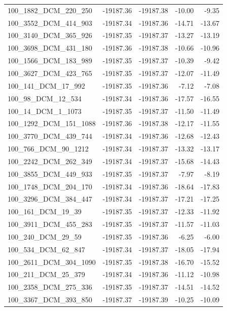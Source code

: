 \documentclass[journal=jacsat,manuscript=article]{achemso}
\begin{document}
\begin{table}[b!]
\begin{tabular}{lrrrr}
100\_1882\_DCM\_220\_250  & -19187.36 & -19187.38 &  -10.00 &  -9.35 \\
100\_3552\_DCM\_414\_903  & -19187.34 & -19187.36 &  -14.71 & -13.67 \\
100\_3140\_DCM\_365\_926  & -19187.35 & -19187.37 &  -13.27 & -13.19 \\
100\_3698\_DCM\_431\_180  & -19187.36 & -19187.38 &  -10.66 & -10.96 \\
100\_1566\_DCM\_183\_989  & -19187.35 & -19187.37 &  -10.39 &  -9.42 \\
100\_3627\_DCM\_423\_765  & -19187.35 & -19187.37 &  -12.07 & -11.49 \\
100\_141\_DCM\_17\_992    & -19187.35 & -19187.36 &   -7.12 &  -7.08 \\
100\_98\_DCM\_12\_534     & -19187.34 & -19187.36 &  -17.57 & -16.55 \\
100\_14\_DCM\_1\_1073     & -19187.35 & -19187.37 &  -11.50 & -11.49 \\
100\_1292\_DCM\_151\_1088 & -19187.36 & -19187.38 &  -12.17 & -11.55 \\
100\_3770\_DCM\_439\_744  & -19187.34 & -19187.36 &  -12.68 & -12.43 \\
100\_766\_DCM\_90\_1212   & -19187.34 & -19187.37 &  -13.32 & -13.17 \\
100\_2242\_DCM\_262\_349  & -19187.34 & -19187.37 &  -15.68 & -14.43 \\
100\_3855\_DCM\_449\_933  & -19187.35 & -19187.37 &   -7.97 &  -8.19 \\
100\_1748\_DCM\_204\_170  & -19187.34 & -19187.36 &  -18.64 & -17.83 \\
100\_3296\_DCM\_384\_447  & -19187.34 & -19187.37 &  -17.21 & -17.25 \\
100\_161\_DCM\_19\_39     & -19187.35 & -19187.37 &  -12.33 & -11.92 \\
100\_3911\_DCM\_455\_283  & -19187.35 & -19187.37 &  -11.57 & -11.03 \\
100\_240\_DCM\_29\_59     & -19187.35 & -19187.36 &   -6.25 &  -6.00 \\
100\_534\_DCM\_62\_847    & -19187.34 & -19187.37 &  -18.05 & -17.94 \\
100\_2611\_DCM\_304\_1090 & -19187.35 & -19187.38 &  -16.70 & -15.52 \\
100\_211\_DCM\_25\_379    & -19187.34 & -19187.36 &  -11.12 & -10.98 \\
100\_2358\_DCM\_275\_336  & -19187.35 & -19187.37 &  -14.51 & -14.52 \\
100\_3367\_DCM\_393\_850  & -19187.37 & -19187.39 &  -10.25 & -10.09 \\

\end{tabular}
\end{table}
\end{document}
